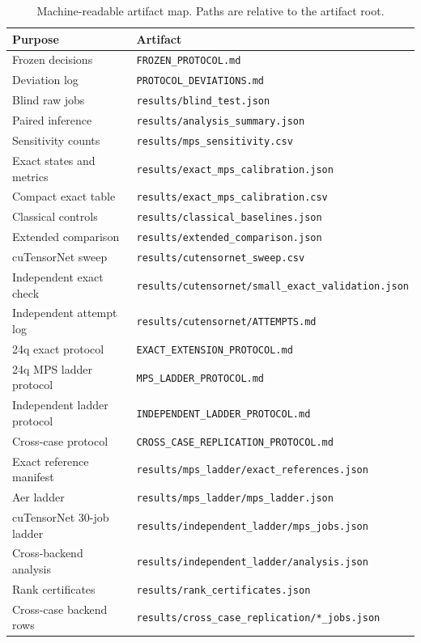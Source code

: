 \documentclass[10pt]{article}
\begin{document}
\begin{table}[H]
\centering
\caption{Machine-readable artifact map. Paths are relative to the artifact
root.}
\begin{tabularx}{\textwidth}{lX}
\toprule
Purpose & Artifact \\
\midrule
Frozen decisions & \texttt{FROZEN\_PROTOCOL.md} \\
Deviation log & \texttt{PROTOCOL\_DEVIATIONS.md} \\
Blind raw jobs & \texttt{results/blind\_test.json} \\
Paired inference & \texttt{results/analysis\_summary.json} \\
Sensitivity counts & \texttt{results/mps\_sensitivity.csv} \\
Exact states and metrics & \texttt{results/exact\_mps\_calibration.json} \\
Compact exact table & \texttt{results/exact\_mps\_calibration.csv} \\
Classical controls & \texttt{results/classical\_baselines.json} \\
Extended comparison & \texttt{results/extended\_comparison.json} \\
cuTensorNet sweep & \texttt{results/cutensornet\_sweep.csv} \\
Independent exact check & \texttt{results/cutensornet/small\_exact\_validation.json} \\
Independent attempt log & \texttt{results/cutensornet/ATTEMPTS.md} \\
24q exact protocol & \texttt{EXACT\_EXTENSION\_PROTOCOL.md} \\
24q MPS ladder protocol & \texttt{MPS\_LADDER\_PROTOCOL.md} \\
Independent ladder protocol & \texttt{INDEPENDENT\_LADDER\_PROTOCOL.md} \\
Cross-case protocol & \texttt{CROSS\_CASE\_REPLICATION\_PROTOCOL.md} \\
Exact reference manifest & \texttt{results/mps\_ladder/exact\_references.json} \\
Aer ladder & \texttt{results/mps\_ladder/mps\_ladder.json} \\
cuTensorNet 30-job ladder & \texttt{results/independent\_ladder/mps\_jobs.json} \\
Cross-backend analysis & \texttt{results/independent\_ladder/analysis.json} \\
Rank certificates & \texttt{results/rank\_certificates.json} \\
Cross-case backend rows & \texttt{results/cross\_case\_replication/*\_jobs.json} \\

\end{tabularx}
\end{table}
\end{document}
